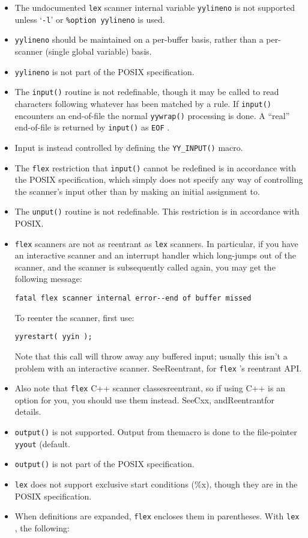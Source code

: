\documentclass[openany,oneside]{book}
\begin{document}
\begin{itemize}
\item The undocumented \verb`lex` scanner internal variable \verb`yylineno` is
not supported unless ‘\verb`-l`’ or \verb`%option yylineno` is used.
\item  \verb`yylineno` should be maintained on a per-buffer basis, rather than
a per-scanner (single global variable) basis.
\item  \verb`yylineno` is not part of the POSIX specification.
\item The \verb`input()` routine is not redefinable, though it may be called
to read characters following whatever has been matched by a rule.  If \verb`input()` encounters an end-of-file the normal \verb`yywrap()` processing is done.  A “real” end-of-file is returned by \verb`input()` as \verb`EOF` .
\item Input is instead controlled by defining the \verb`YY_INPUT()` macro.
\item The \verb`flex` restriction that \verb`input()` cannot be redefined is
in accordance with the POSIX specification, which simply does not
specify any way of controlling the scanner's input other than by making
an initial assignment to.
\item The \verb`unput()` routine is not redefinable.  This restriction is in
accordance with POSIX.
\item  \verb`flex` scanners are not as reentrant as \verb`lex` scanners.  In
particular, if you have an interactive scanner and an interrupt handler
which long-jumps out of the scanner, and the scanner is subsequently
called again, you may get the following message:


\begin{verbatim}
fatal flex scanner internal error--end of buffer missed
\end{verbatim}


To reenter the scanner, first use:


\begin{verbatim}
yyrestart( yyin );
\end{verbatim}


Note that this call will throw away any buffered input; usually this
isn't a problem with an interactive scanner. SeeReentrant, for \verb`flex` 's reentrant API.
\item Also note that \verb`flex` C++ scanner classesreentrant, so if using C++ is an option for you, you should use
them instead.  SeeCxx, andReentrantfor details.
\item  \verb`output()` is not supported.  Output from themacro is
done to the file-pointer \verb`yyout` (default.
\item  \verb`output()` is not part of the POSIX specification.
\item  \verb`lex` does not support exclusive start conditions (\%{}x), though they
are in the POSIX specification.
\item When definitions are expanded, \verb`flex` encloses them in parentheses. 
With \verb`lex` , the following:



\end{itemize}
\end{document}
